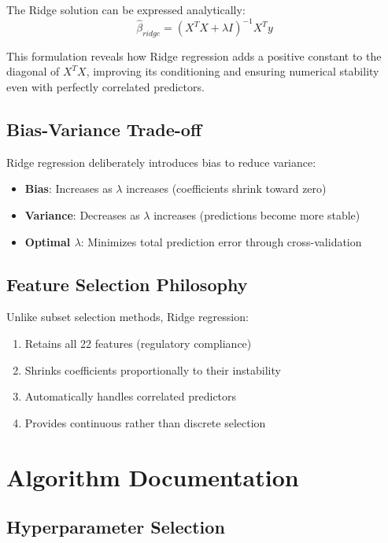 The Ridge solution can be expressed analytically:
\begin{equation}
\hat{\beta}_{ridge} = (X^TX + \lambda I)^{-1}X^Ty
\end{equation}

This formulation reveals how Ridge regression adds a positive constant to the diagonal of $X^TX$, improving its conditioning and ensuring numerical stability even with perfectly correlated predictors.

\subsection{Bias-Variance Trade-off}

Ridge regression deliberately introduces bias to reduce variance:
\begin{itemize}
    \item \textbf{Bias}: Increases as $\lambda$ increases (coefficients shrink toward zero)
    \item \textbf{Variance}: Decreases as $\lambda$ increases (predictions become more stable)
    \item \textbf{Optimal $\lambda$}: Minimizes total prediction error through cross-validation
\end{itemize}

\subsection{Feature Selection Philosophy}

Unlike subset selection methods, Ridge regression:
\begin{enumerate}
    \item Retains all 22 features (regulatory compliance)
    \item Shrinks coefficients proportionally to their instability
    \item Automatically handles correlated predictors
    \item Provides continuous rather than discrete selection
\end{enumerate}

\section{Algorithm Documentation}

\subsection{Hyperparameter Selection}

